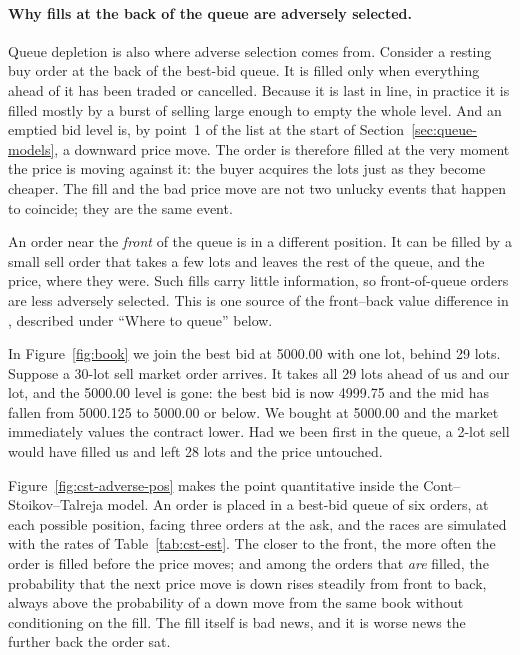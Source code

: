 \paragraph{Why fills at the back of the queue are adversely selected.} Queue depletion is also where adverse selection
comes from. Consider a resting buy order at the back of the best-bid queue. It is filled only when
everything ahead of it has been traded or cancelled. Because it is last in line, in practice it is
filled mostly by a burst of selling large enough to empty the whole level. And an emptied bid level is,
by point~1 of the list at the start of Section~\ref{sec:queue-models}, a downward price move. The
order is therefore filled at the very moment the price is moving against it: the buyer acquires
the lots just as they become cheaper. The fill and the bad price move are not two unlucky events
that happen to coincide; they are the same event.

An order near the \emph{front} of the queue is in a different position. It can be filled by a small
sell order that takes a few lots and leaves the rest of the queue, and the price, where they were.
Such fills carry little information, so front-of-queue orders are less adversely selected. This is
one source of the front--back value difference in \citet{moallemi2017}, described under ``Where to
queue'' below.

\begin{example}
In Figure~\ref{fig:book} we join the best bid at 5000.00 with one lot, behind 29 lots. Suppose a
30-lot sell market order arrives. It takes all 29 lots ahead of us and our lot, and the 5000.00
level is gone: the best bid is now 4999.75 and the mid has fallen from 5000.125 to 5000.00 or below.
We bought at 5000.00 and the market immediately values the contract lower. Had we been first in the
queue, a 2-lot sell would have filled us and left 28 lots and the price untouched.
\end{example}

Figure~\ref{fig:cst-adverse-pos} makes the point quantitative inside the Cont--Stoikov--Talreja model.
An order is placed in a best-bid queue of six orders, at each possible position, facing three orders at
the ask, and the races are simulated with the rates of Table~\ref{tab:cst-est}. The closer to the front,
the more often the order is filled before the price moves; and among the orders that \emph{are} filled,
the probability that the next price move is down rises steadily from front to back, always above the
probability of a down move from the same book without conditioning on the fill. The fill itself is bad
news, and it is worse news the further back the order sat.

